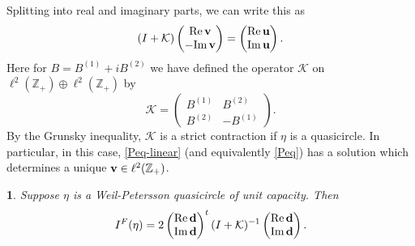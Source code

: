 \documentclass{article}
\numberwithin{equation}{section}
\numberwithin{figure}{section}
\theoremstyle{plain}
\theoremstyle{plain}
\newtheorem{lemma}[thm]{\protect\lemmaname}
\numberwithin{thm}{section}
\theoremstyle{remark}
\providecommand{\lemmaname}{Lemma}
\newcommand{\re}{\text{{\rm Re}\,}}
\newcommand{\im}{\text{{\rm Im}\,}}
\newcommand{\Z}{\mathbb{Z}}
\begin{document}
Splitting into real and imaginary parts, we can write this as 
\begin{equation}\label{Peq-linear}
 (I+\mathcal{K}) \begin{pmatrix}
     \re {\bf v} \\ -\im {\bf v}
 \end{pmatrix}
 =
\begin{pmatrix}
     \re {\bf u} \\ \im {\bf u}
 \end{pmatrix}.
\end{equation}
Here for $B=B^{(1)}+iB^{(2)}$  we have defined the operator $\mathcal{K}$ on $\ell^2(\Z_+)\oplus\ell^2(\Z_+)$ by
\begin{equation}\label{Kop}
 \mathcal{K}=\begin{pmatrix} B^{(1)} & B^{(2)}\\  B^{(2)} &-B^{(1)} \end{pmatrix}.  
\end{equation}
By the Grunsky inequality, $\mathcal{K}$ is a strict contraction if $\eta$ is a quasicircle. In particular, in this case, \eqref{Peq-linear} (and equivalently \eqref{Peq}) has a solution which determines a unique ${\bf v} \in \ell^2(\Z_+)$. 
\begin{lemma}\label{lem:Penergy-Dirichlet}
Suppose $\eta$ is a Weil-Petersson quasicircle of unit capacity. Then 
\begin{equation}\label{Epomm}
 I^F(\eta) =2\begin{pmatrix}
     \re {\bf d} \\ \im {\bf d}
 \end{pmatrix} ^t(I+\mathcal{K})^{-1} 
\begin{pmatrix}
     \re {\bf d} \\ \im {\bf d}
 \end{pmatrix}.
\end{equation}
\end{lemma}
\end{document}
